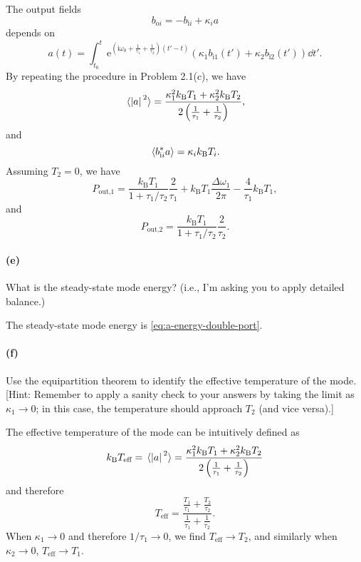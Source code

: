 \documentclass[hyperref, a4paper]{article}
\newcommand*{\ii}{\mathrm{i}}
\newcommand*{\ee}{\mathrm{e}}
\newcommand*{\kB}{k_{\text{B}}}
\newcommand*{\bii}[1]{b_{\text{i#1}}}
\newcommand*{\boi}[1]{b_{\text{o#1}}}
\begin{document}
The output fields 
\begin{equation}
    \boi{$i$} = - \bii{$i$} + \kappa_i a
\end{equation}
depends on 
\begin{equation}
    a(t) = \int_{t_0}^{t} \ee^{\left( \ii \omega_0 + \frac{1}{\tau_1} + \frac{1}{\tau_2} \right) (t' - t)} (\kappa_1 \bii{1}(t') + \kappa_2 \bii{2}(t')) \dd{t'}.
\end{equation}
By repeating the procedure in Problem 2.1(c), we have 
\begin{equation}
    \expval*{\abs*{a}^2} = \frac{\kappa_1^2 \kB T_1 + \kappa_2^2 \kB T_2}{2 \left( \frac{1}{\tau_1} + \frac{1}{\tau_2} \right)},
    \label{eq:a-energy-double-port}
\end{equation}
and 
\begin{equation}
    \expval*{\bii{$i$}^* a} = \kappa_i \kB T_i.
\end{equation}
Assuming $T_2 = 0$, we have 
\begin{equation}
    P_{\text{out,1}} = \frac{\kB T_1}{1 + \tau_1 / \tau_2} \frac{2}{\tau_1} + \kB T_1 \frac{\Delta \omega_1}{2\pi} - \frac{4}{\tau_1} \kB T_1,
\end{equation}
and 
\begin{equation}
    P_{\text{out,2}} = \frac{\kB T_1}{1 + \tau_1 / \tau_2} \frac{2}{\tau_2} .
\end{equation}

\paragraph*{(e)} What is the steady-state mode energy? (i.e., I'm asking you to apply detailed balance.)

The steady-state mode energy is \eqref{eq:a-energy-double-port}.

\paragraph*{(f)} Use the equipartition theorem to identify the effective temperature of the mode. [Hint: Remember to apply a sanity check to your answers by taking the limit as $\kappa_1 \rightarrow 0$; in this case, the temperature should approach $T_2$ (and vice versa).]

The effective temperature of the mode can be intuitively defined as 
\begin{equation}
    \kB T_{\text{eff}} = \expval*{\abs*{a}^2} = \frac{\kappa_1^2 \kB T_1 + \kappa_2^2 \kB T_2}{2 \left( \frac{1}{\tau_1} + \frac{1}{\tau_2} \right)}
\end{equation}
and therefore 
\begin{equation}
    T_{\text{eff}} = \frac{\frac{T_1}{\tau_1} + \frac{T_2}{\tau_2}}{\frac{1}{\tau_1} + \frac{1}{\tau_2}}.
\end{equation}
When $\kappa_1 \to 0$ and therefore $1/\tau_1 \to 0$, we find $T_{\text{eff}} \to T_2$,
and similarly when $\kappa_2 \to 0$, $T_{\text{eff}} \to T_1$.
\end{document}
